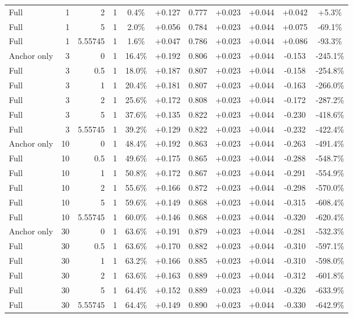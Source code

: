 \begin{table}[htbp]
\begin{tabular}{lrrrccccccc}
Full & 1 & 2 & 1 & 0.4\% & +0.127 & 0.777 & +0.023 & +0.044 & +0.042 & +5.3\% \\
Full & 1 & 5 & 1 & 2.0\% & +0.056 & 0.784 & +0.023 & +0.044 & +0.075 & -69.1\% \\
Full & 1 & 5.55745 & 1 & 1.6\% & +0.047 & 0.786 & +0.023 & +0.044 & +0.086 & -93.3\% \\
Anchor only & 3 & 0 & 1 & 16.4\% & +0.192 & 0.806 & +0.023 & +0.044 & -0.153 & -245.1\% \\
Full & 3 & 0.5 & 1 & 18.0\% & +0.187 & 0.807 & +0.023 & +0.044 & -0.158 & -254.8\% \\
Full & 3 & 1 & 1 & 20.4\% & +0.181 & 0.807 & +0.023 & +0.044 & -0.163 & -266.0\% \\
Full & 3 & 2 & 1 & 25.6\% & +0.172 & 0.808 & +0.023 & +0.044 & -0.172 & -287.2\% \\
Full & 3 & 5 & 1 & 37.6\% & +0.135 & 0.822 & +0.023 & +0.044 & -0.230 & -418.6\% \\
Full & 3 & 5.55745 & 1 & 39.2\% & +0.129 & 0.822 & +0.023 & +0.044 & -0.232 & -422.4\% \\
Anchor only & 10 & 0 & 1 & 48.4\% & +0.192 & 0.863 & +0.023 & +0.044 & -0.263 & -491.4\% \\
Full & 10 & 0.5 & 1 & 49.6\% & +0.175 & 0.865 & +0.023 & +0.044 & -0.288 & -548.7\% \\
Full & 10 & 1 & 1 & 50.8\% & +0.172 & 0.867 & +0.023 & +0.044 & -0.291 & -554.9\% \\
Full & 10 & 2 & 1 & 55.6\% & +0.166 & 0.872 & +0.023 & +0.044 & -0.298 & -570.0\% \\
Full & 10 & 5 & 1 & 59.6\% & +0.149 & 0.868 & +0.023 & +0.044 & -0.315 & -608.4\% \\
Full & 10 & 5.55745 & 1 & 60.0\% & +0.146 & 0.868 & +0.023 & +0.044 & -0.320 & -620.4\% \\
Anchor only & 30 & 0 & 1 & 63.6\% & +0.191 & 0.879 & +0.023 & +0.044 & -0.281 & -532.3\% \\
Full & 30 & 0.5 & 1 & 63.6\% & +0.170 & 0.882 & +0.023 & +0.044 & -0.310 & -597.1\% \\
Full & 30 & 1 & 1 & 63.2\% & +0.166 & 0.885 & +0.023 & +0.044 & -0.310 & -598.0\% \\
Full & 30 & 2 & 1 & 63.6\% & +0.163 & 0.889 & +0.023 & +0.044 & -0.312 & -601.8\% \\
Full & 30 & 5 & 1 & 64.4\% & +0.152 & 0.889 & +0.023 & +0.044 & -0.326 & -633.9\% \\
Full & 30 & 5.55745 & 1 & 64.4\% & +0.149 & 0.890 & +0.023 & +0.044 & -0.330 & -642.9\% \\

\end{tabular}
\end{table}
